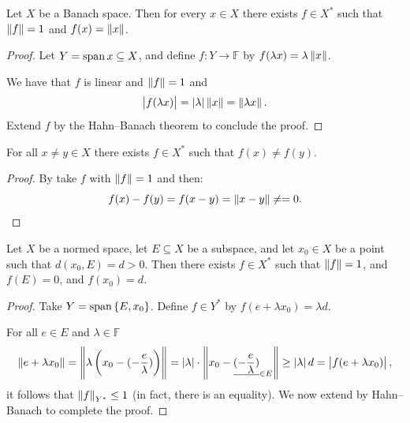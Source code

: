 \documentclass[11pt,a4paper]{article}
\begin{document}
\begin{corollary}
  \label{cor:hahn-banach-one}
  Let $X$ be a Banach space.
  Then for every $x \in X$ there exists $f \in X^*$ such that
  $\left\lVert f\right\rVert = 1$ and $f(x) = \left\lVert x\right\rVert$.
\end{corollary}
\begin{proof}
  Let $Y = \operatorname{span}{x} \subseteq X$,
  and define $f \colon Y \to \mathbb F$ by $f(\lambda x) = \lambda \left\lVert x\right\rVert$.

  We have that $f$ is linear and $\left\lVert f\right\rVert = 1$ and
  \[
    \left\lvert f(\lambda x)\right\rvert =
    \left\lvert\lambda\right\rvert \left\lVert x\right\rVert =
    \left\lVert\lambda x\right\rVert.
  \]
  Extend $f$ by the Hahn--Banach theorem to conclude the proof.
\end{proof}

\begin{corollary}
  For all $x \neq y \in X$ there exists $f \in X^*$ such that
  $f(x) \neq f(y)$.
\end{corollary}
\begin{proof}
  By 
  take $f$ with $\left\lVert f\right\rVert = 1$
  and then:
  \[
    f(x) - f(y) =
    f(x - y) =
    \left\lVert x - y\right\rVert \neq = 0.
  \]
\end{proof}

\begin{corollary}
  Let $X$ be a normed space,
  let $E \subseteq X$ be a subspace,
  and let $x_0 \in X$ be a point such that $d(x_0,E) = d > 0$.
  Then there exists $f \in X^*$ such that $\left\lVert f\right\rVert = 1$,
  and $f(E) = 0$, and $f(x_0) = d$.
\end{corollary}
\begin{proof}
  Take $Y = \operatorname{span}\left\{E,x_0\right\}$.
  Define $f \in Y^*$ by $f(e + \lambda x_0) = \lambda d$.

  For all $e \in E$ and $\lambda \in \mathbb F$
  \[
    \norm{e + \lambda x_0} =
    \norm{\lambda\del{x_0 - (- \frac{e}{\lambda})}} =
    \abs{\lambda} \cdot \norm{x_0 - \underline{(- \frac{e}{\lambda})}_{\in E}} \geq
    \abs{\lambda} d =
    \abs{f(e + \lambda x_0)},
  \]
  it follows that $\left\lVert f\right\rVert_{Y^*} \le 1$ (in fact, there is an equality).
  We now extend by Hahn--Banach to complete the proof.
\end{proof}
\end{document}
